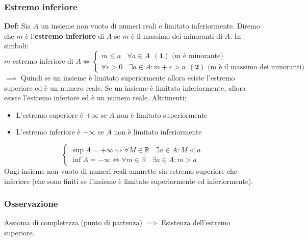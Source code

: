 \documentclass{article}
\newcommand{\R}{\mathbb{R}}
\begin{document}
\subsubsection{Estremo inferiore}
\textbf{Def:} Sia $A$ un insieme non vuoto di numeri reali e limitato inferiormente. Diremo che $m$ è l'\textbf{estremo inferiore} di $A$ se $m$ è il massimo dei minoranti di $A$. In simboli:
\[
    m \text{ estremo inferiore di } A \iff \begin{cases}
        m \leq a  \ \ \ \ \forall a \in A \ \ (\textbf{1}) \text{ (m è minorante)} \\
        \forall \varepsilon > 0 \ \ \ \ \exists a \in A : m + \varepsilon > a \ \ (\textbf{2}) \text{ (m è il massimo dei minoranti)}
    \end{cases}
\]
$\implies$ Quindi se un insieme è limitato superiormente allora esiste l'estremo superiore ed è un numero reale. Se un insieme è limitato inferiormente, allora esiste l'estremo inferiore ed è un numero reale.
Altrimenti:
\begin{itemize}
    \item L'estremo superiore è $+\infty$ se $A$ non è limitato superiormente
    \item L'estremo inferiore è $-\infty$ se $A$ non è limitato inferiormente
\end{itemize}
\[
    \begin{cases}
        \sup A = +\infty \iff \forall M \in \R \ \ \ \ \exists a \in A : M < a \\
        \inf A = -\infty \iff \forall m \in \R \ \ \ \ \exists a \in A : m > a
    \end{cases}
\]
Ongi insieme non vuoto di numeri reali ammette sia estremo superiore che
inferiore (che sono finiti se l'insieme è limitato superiormente ed
inferiormente).

\subsubsection{Osservazione}
Assioma di completezza (punto di partenza) $\implies$ Esistenza dell'estremo
superiore.
\end{document}
